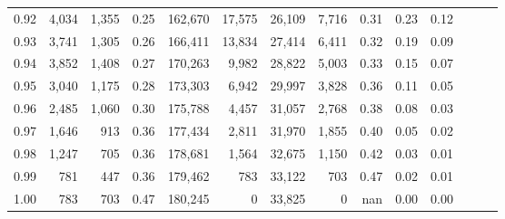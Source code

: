 \begin{tabular}{rrrrrrrrrrrrrr}
0.92 &  4,034 &  1,355 &  0.25 &  162,670 &   17,575 &  26,109 &   7,716 &  0.31 &  0.23 &      0.12 \\
0.93 &  3,741 &  1,305 &  0.26 &  166,411 &   13,834 &  27,414 &   6,411 &  0.32 &  0.19 &      0.09 \\
0.94 &  3,852 &  1,408 &  0.27 &  170,263 &    9,982 &  28,822 &   5,003 &  0.33 &  0.15 &      0.07 \\
0.95 &  3,040 &  1,175 &  0.28 &  173,303 &    6,942 &  29,997 &   3,828 &  0.36 &  0.11 &      0.05 \\
0.96 &  2,485 &  1,060 &  0.30 &  175,788 &    4,457 &  31,057 &   2,768 &  0.38 &  0.08 &      0.03 \\
0.97 &  1,646 &    913 &  0.36 &  177,434 &    2,811 &  31,970 &   1,855 &  0.40 &  0.05 &      0.02 \\
0.98 &  1,247 &    705 &  0.36 &  178,681 &    1,564 &  32,675 &   1,150 &  0.42 &  0.03 &      0.01 \\
0.99 &    781 &    447 &  0.36 &  179,462 &      783 &  33,122 &     703 &  0.47 &  0.02 &      0.01 \\
1.00 &    783 &    703 &  0.47 &  180,245 &        0 &  33,825 &       0 &   nan &  0.00 &      0.00 \\
\bottomrule
\end{tabular}
